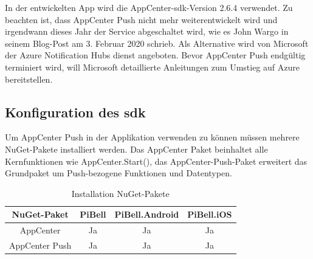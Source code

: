 In der entwickelten App wird die AppCenter-\acs{sdk}-Version 2.6.4 verwendet. Zu beachten ist, dass AppCenter Push nicht mehr weiterentwickelt wird und irgendwann dieses Jahr der Service abgeschaltet wird, wie es John Wargo in seinem Blog-Post am 3. Februar 2020 schrieb. Als Alternative wird von Microsoft der Azure Notification Hubs dienst angeboten. Bevor AppCenter Push endgültig terminiert wird, will Microsoft detaillierte Anleitungen zum Umstieg auf Azure bereitstellen.\par

\subsection{Konfiguration des \acs{sdk}}
Um AppCenter Push in der Applikation verwenden zu können müssen mehrere NuGet-Pakete installiert werden.
Das AppCenter Paket beinhaltet alle Kernfunktionen wie AppCenter.Start(), das AppCenter-Push-Paket erweitert das Grundpaket um Push-bezogene Funktionen und Datentypen.
\begin{table}[H]
    \centering\begin{tabular}{|c|c|c|c|}
        \hline
        NuGet-Paket & PiBell & PiBell.Android & PiBell.iOS\\
        \hline
        AppCenter & Ja & Ja & Ja\\
        AppCenter Push & Ja & Ja & Ja\\
        \hline    
    \end{tabular}
    \caption{Installation NuGet-Pakete}
\end{table}